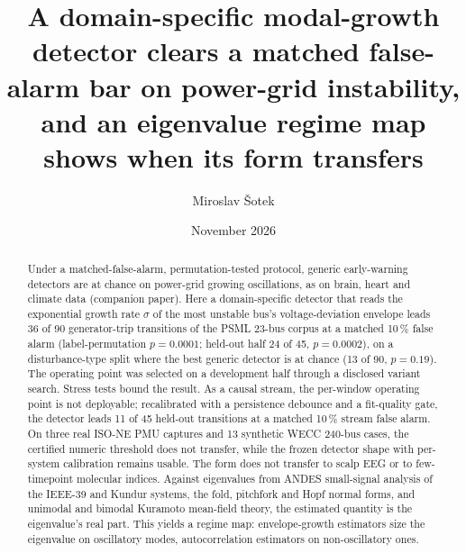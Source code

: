 \documentclass[aip,cha,preprint,amsmath,amssymb]{revtex4-2}
\begin{document}
\title{A domain-specific modal-growth detector clears a matched
false-alarm bar on power-grid instability, and an eigenvalue regime map
shows when its form transfers}
\author{Miroslav \v{S}otek}

\date{November 2026}

\begin{abstract}
Under a matched-false-alarm, permutation-tested protocol, generic
early-warning detectors are at chance on power-grid growing
oscillations, as on brain, heart and climate data (companion paper).
Here a domain-specific detector that reads the exponential growth rate
$\sigma$ of the most unstable bus's voltage-deviation envelope leads 36
of 90 generator-trip transitions of the PSML 23-bus corpus at a matched
10\,\% false alarm (label-permutation $p = 0.0001$; held-out half 24 of
45, $p = 0.0002$), on a disturbance-type split where the best generic
detector is at chance (13 of 90, $p = 0.19$). The operating point was
selected on a development half through a disclosed variant search.
Stress tests bound the result. As a causal stream, the per-window
operating point is not deployable; recalibrated with a persistence
debounce and a fit-quality gate, the detector leads 11 of 45 held-out
transitions at a matched 10\,\% stream false alarm. On three real ISO-NE
PMU captures and 13 synthetic WECC 240-bus cases, the certified numeric
threshold does not transfer, while the frozen detector shape with
per-system calibration remains usable. The form does not transfer to
scalp EEG or to few-timepoint molecular indices. Against eigenvalues
from ANDES small-signal analysis of the IEEE-39 and Kundur systems, the
fold, pitchfork and Hopf normal forms, and unimodal and bimodal Kuramoto
mean-field theory, the estimated quantity is the eigenvalue's real part.
This yields a regime map: envelope-growth estimators size the
eigenvalue on oscillatory modes, autocorrelation estimators on
non-oscillatory ones.
\end{abstract}

\maketitle
\end{document}
